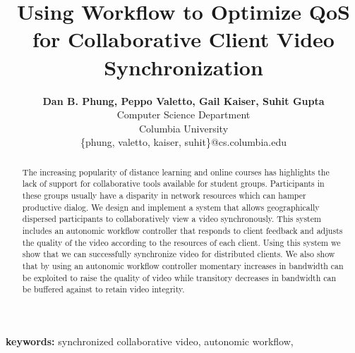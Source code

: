 \documentclass[12pt]{article}
\title{Using Workflow to Optimize QoS for Collaborative Client Video
Synchronization}
\author{
 \textbf{Dan B. Phung, Peppo Valetto, Gail Kaiser, Suhit Gupta}\\
Computer Science Department\\
Columbia University\\
\{phung, valetto, kaiser, suhit\}@cs.columbia.edu
}
\date{
\parbox[b][0ex]{0em}{\hspace*{-12.5em}\raisebox{37ex}{\fbox{For
submission to \emph{ACM-MM 2004}, due 12:00 AM EDT: April 05, 2004.}}}}
\begin{document}
\begin{singlespace}
\maketitle
\end{singlespace}

%
% 
% 
% 
% 

\begin{abstract}\noindent
The increasing popularity of distance learning and online courses has
highlights the lack of support for collaborative tools available for
student groups.  Participants in these groups usually have a disparity
in network resources which can hamper productive dialog.  We design
and implement a system that allows geographically dispersed
participants to collaboratively view a video synchronously.  This
system includes an autonomic workflow controller that responds to
client feedback and adjusts the quality of the video according to the
resources of each client.  Using this system we show that we can
successfully synchronize video for distributed clients.  We also show
that by using an autonomic workflow controller momentary increases in
bandwidth can be exploited to raise the quality of video while
transitory decreases in bandwidth can be buffered against to retain
video integrity.
\end{abstract}

\textbf{keywords:} synchronized collaborative video, autonomic
workflow,
\end{document}
